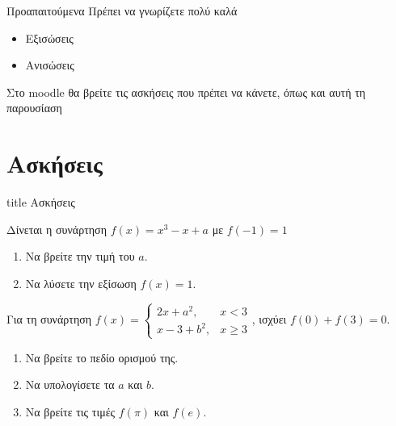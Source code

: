 \documentclass{presentation}
\begin{document}
\begin{frame}{Προαπαιτούμενα}
  Πρέπει να γνωρίζετε πολύ καλά
  \begin{itemize}
    \item Εξισώσεις
    \item Ανισώσεις
  \end{itemize}
\end{frame}

\begin{frame}[noframenumbering]
  Στο moodle θα βρείτε τις ασκήσεις που πρέπει να κάνετε, όπως και αυτή τη παρουσίαση
\end{frame}

\section{Ασκήσεις}

\begin{frame}[noframenumbering]
  \vfill
  \centering
  \begin{beamercolorbox}[sep=8pt,center,shadow=true,rounded=true]{title}
    Ασκήσεις
  \end{beamercolorbox}
  \vfill
\end{frame}

\begin{askisi}
  Δίνεται η συνάρτηση $f(x)=x^3-x+a$ με $f(-1)=1$
  \begin{enumerate}
    \item<1-> Να βρείτε την τιμή του $a$.
    \item<2-> Να λύσετε την εξίσωση $f(x)=1$.
  \end{enumerate}
\end{askisi}

\begin{askisi}
  Για τη συνάρτηση $f(x)=\begin{cases}
      2x+a^2,  & x<3   \\
      x-3+b^2, & x\ge3
    \end{cases}$, ισχύει $f(0)+f(3)=0$.
  \begin{enumerate}
    \item<1-> Να βρείτε το πεδίο ορισμού της.
    \item<2-> Να υπολογίσετε τα $a$ και $b$.
    \item<3-> Να βρείτε τις τιμές $f(\pi)$ και $f(e)$.
  \end{enumerate}
\end{askisi}
\end{document}
